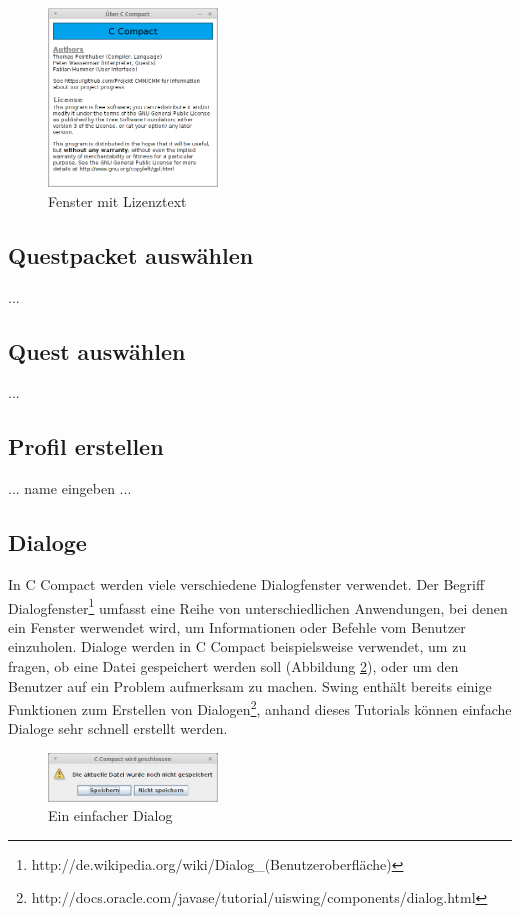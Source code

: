 \begin{figure}[htp]
\centering
\includegraphics[width=0.4\textwidth]{./media/images/gui/elements/Bildschirmfoto-About.png}
\caption{Fenster mit Lizenztext}
\label{fig:win-about}
\end{figure}

\subsection{Questpacket auswählen}
...

\subsection{Quest auswählen}
...

\subsection{Profil erstellen}
... name eingeben ...

\subsection{Dialoge}
\label{sec:win-dialog}
In C Compact werden viele verschiedene Dialogfenster verwendet. Der Begriff Dialogfenster\footnote{http://de.wikipedia.org/wiki/Dialog\_(Benutzeroberfläche)} umfasst eine Reihe von unterschiedlichen Anwendungen, bei denen ein Fenster werwendet wird, um Informationen oder Befehle vom Benutzer einzuholen. Dialoge werden in C Compact beispielsweise verwendet, um zu fragen, ob eine Datei gespeichert werden soll (Abbildung \ref{fig:win-dialog}), oder um den Benutzer auf ein Problem aufmerksam zu machen. Swing enthält bereits einige Funktionen zum Erstellen von Dialogen\footnote{http://docs.oracle.com/javase/tutorial/uiswing/components/dialog.html}, anhand dieses Tutorials können einfache Dialoge sehr schnell erstellt werden.

\begin{figure}[htp]
\centering
\includegraphics[width=0.4\textwidth]{./media/images/gui/elements/Bildschirmfoto-Dialog.png}
\caption{Ein einfacher Dialog}
\label{fig:win-dialog}
\end{figure}


